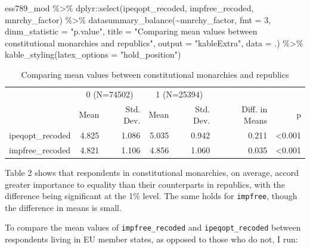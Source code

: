 \documentclass[
]{article}
\newenvironment{Shaded}{\begin{snugshade}}{\end{snugshade}}
\newcommand{\AttributeTok}[1]{\textcolor[rgb]{0.77,0.63,0.00}{#1}}
\newcommand{\DecValTok}[1]{\textcolor[rgb]{0.00,0.00,0.81}{#1}}
\newcommand{\FunctionTok}[1]{\textcolor[rgb]{0.00,0.00,0.00}{#1}}
\newcommand{\NormalTok}[1]{#1}
\newcommand{\SpecialCharTok}[1]{\textcolor[rgb]{0.00,0.00,0.00}{#1}}
\newcommand{\StringTok}[1]{\textcolor[rgb]{0.31,0.60,0.02}{#1}}
\begin{document}
\begin{Shaded}
\begin{Highlighting}[]
\NormalTok{ess789\_mod }\SpecialCharTok{\%\textgreater{}\%}
\NormalTok{ dplyr}\SpecialCharTok{::}\FunctionTok{select}\NormalTok{(ipeqopt\_recoded, impfree\_recoded, mnrchy\_factor) }\SpecialCharTok{\%\textgreater{}\%}
 \FunctionTok{datasummary\_balance}\NormalTok{(}\SpecialCharTok{\textasciitilde{}}\NormalTok{mnrchy\_factor, }\AttributeTok{fmt =} \DecValTok{3}\NormalTok{,}
                     \AttributeTok{dinm\_statistic =} \StringTok{"p.value"}\NormalTok{,}
                     \AttributeTok{title =} \StringTok{"Comparing mean values between constitutional monarchies and republics"}\NormalTok{,}
                     \AttributeTok{output =} \StringTok{"kableExtra"}\NormalTok{,}
                     \AttributeTok{data =}\NormalTok{ .) }\SpecialCharTok{\%\textgreater{}\%}
  \FunctionTok{kable\_styling}\NormalTok{(}\AttributeTok{latex\_options =} \StringTok{"hold\_position"}\NormalTok{)}
\end{Highlighting}
\end{Shaded}

\begin{table}[!h]

\caption{\label{tab:mean-equal-free-monarchy}Comparing mean values between constitutional monarchies and republics}
\centering
\begin{tabular}[t]{lrrrrrr}
\toprule
\multicolumn{1}{c}{ } & \multicolumn{2}{c}{0 (N=74502)} & \multicolumn{2}{c}{1 (N=25394)} & \multicolumn{2}{c}{ } \\
\cmidrule(l{3pt}r{3pt}){2-3} \cmidrule(l{3pt}r{3pt}){4-5}
  & Mean & Std. Dev. & Mean & Std. Dev. & Diff. in Means & p\\
\midrule
ipeqopt\_recoded & 4.825 & 1.086 & 5.035 & 0.942 & 0.211 & <0.001\\
impfree\_recoded & 4.821 & 1.106 & 4.856 & 1.060 & 0.035 & <0.001\\
\bottomrule
\end{tabular}
\end{table}

Table 2 shows that respondents in constitutional monarchies, on average,
accord greater importance to equality than their counterparts in
republics, with the difference being significant at the 1\% level. The
same holds for \texttt{impfree}, though the difference in means is
small.

To compare the mean values of \texttt{impfree\_recoded} and
\texttt{ipeqopt\_recoded} between respondents living in EU member
states, as opposed to those who do not, I run:
\end{document}
